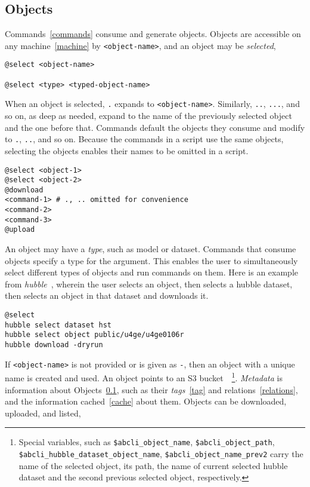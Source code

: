 \subsection{Objects}
\label{objects}

Commands~\ref{commands} consume and generate objects. Objects are accessible on any machine~\ref{machine} by \texttt{<object-name>}, and an object may be \emph{selected},
%
\begin{verbatim}
@select <object-name>

@select <type> <typed-object-name>
\end{verbatim}
%
When an object is selected, \texttt{.} expands to \texttt{<object-name>}. Similarly, \texttt{..}, \texttt{...}, and so on, as deep as needed, expand to the name of the previously selected object and the one before that. Commands default the objects they consume and modify to \texttt{.}, \texttt{..}, and so on. Because the commands in a script use the same objects, selecting the objects enables their names to be omitted in a script.
%
\begin{verbatim}
@select <object-1>
@select <object-2>
@download
<command-1> # ., .. omitted for convenience
<command-2>
<command-3>
@upload
\end{verbatim}
%
An object may have a \emph{type}, such as model or dataset. Commands that consume objects specify a type for the argument. This enables the user to simultaneously select different types of objects and run commands on them. Here is an example from \emph{hubble}~, wherein the user selects an object, then selects a hubble dataset,  then selects an object in that dataset and downloads it.
%
\begin{verbatim}
@select
hubble select dataset hst
hubble select object public/u4ge/u4ge0106r
hubble download -dryrun
\end{verbatim}
%
If \texttt{<object-name>} is not provided or is given as \texttt{-}, then an object with a unique name is created and used. An object points to an S3 bucket~~\footnote{Special variables, such as \texttt{\$abcli\_object\_name}, \texttt{\$abcli\_object\_path}, \texttt{\$abcli\_hubble\_dataset\_object\_name}, \texttt{\$abcli\_object\_name\_prev2} carry the name of the selected object, its path, the name of current selected hubble dataset and the second previous selected object, respectively.}. \emph{Metadata} is information about Objects~\ref{objects}, such as their \emph{tags}~\ref{tag} and relations~\ref{relations}, and the information cached~\ref{cache} about them. Objects can be downloaded, uploaded, and listed,
